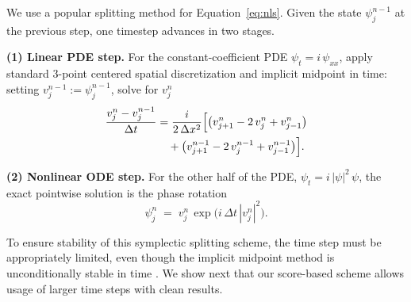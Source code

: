 \documentclass[letterpaper]{article} %
\def\Eqref#1{Equation~\ref{#1}}
\providecommand{\Eqref}[1]{\Cref{#1}}
\begin{document}
We use a popular splitting method for \Eqref{eq:nls}. Given the
state $\psi_j^{n-1}$ at the previous step, one timestep advances in two
stages.

\textbf{(1) Linear PDE step.} For the constant-coefficient PDE $\psi_t = i\,\psi_{xx}$, apply standard 3-point
centered spatial discretization and implicit midpoint in time: setting
$v_j^{n-1} := \psi_j^{n-1}$, solve for $v_j^n$
\begin{equation}\label{eq:nls_lin}
\begin{split}
  \frac{v_j^n - v_j^{n-1}}{\Delta t} &= \frac{i}{2\,\Delta x^2} \Bigl[\bigl(v_{j+1}^n - 2\,v_j^n + v_{j-1}^n\bigr) \\
  &\quad + \bigl(v_{j+1}^{n-1} - 2\,v_j^{n-1} + v_{j-1}^{n-1}\bigr)\Bigr].
\end{split}
\end{equation}

\textbf{(2) Nonlinear ODE step.} For the other half of the PDE, $\psi_t = i\,| \psi |^2\,\psi$,
the exact pointwise solution is the phase rotation
\begin{equation}\label{eq:nls_nl}
    \psi_j^n \;=\; v_j^n\,\exp\!\bigl(i\,\Delta t\,|v_j^n|^2\bigr).
\end{equation}



To ensure stability of this symplectic splitting scheme, the time step must be appropriately limited, even though the implicit midpoint method is unconditionally stable in time \citep{faou12,wehe,lubich08}. We show next that our score-based scheme allows usage of larger time steps with clean results.
\end{document}
